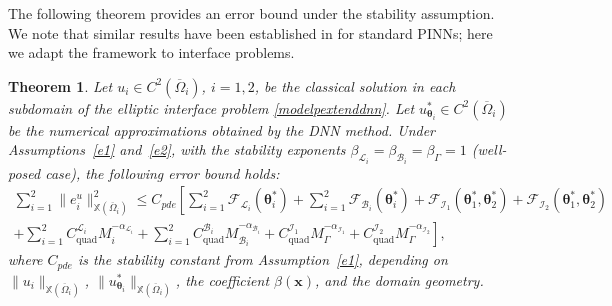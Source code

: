 \documentclass{article}
\newtheorem{theorem}{Theorem}[section]
\begin{document}
The following theorem provides an error bound under the stability assumption. We note that similar results have been established in \cite{mishra2023estimates} for standard PINNs; here we adapt the framework to interface problems.
\begin{theorem}\label{thm:errorEstimation}
Let $u_i \in C^2(\overline{\Omega}_i)$, $i = 1, 2$, be the classical solution in each subdomain of the elliptic interface problem \eqref{modelpextenddnn}. Let $u_{\boldsymbol{\theta}_i}^{*} \in C^2(\overline{\Omega}_i)$ be the numerical approximations obtained by the DNN method. Under Assumptions~\ref{e1} and~\ref{e2}, with the stability exponents $\beta_{\mathcal{L}_i} = \beta_{\mathcal{B}_i} = \beta_{\Gamma} = 1$ (well-posed case), the following error bound holds:
\begin{equation}
\begin{aligned}
\sum_{i=1}^{2} \|e_i^u\|^2_{\mathbb{X}(\overline{\Omega}_i)} \leq C_{pde} \left[ \sum_{i=1}^{2} \mathcal{F}_{\mathcal{L}_i}(\boldsymbol{\theta}_i^*) + \sum_{i=1}^{2} \mathcal{F}_{\mathcal{B}_i}(\boldsymbol{\theta}_i^*) + \mathcal{F}_{\mathcal{I}_1}(\boldsymbol{\theta}_1^*, \boldsymbol{\theta}_2^*) + \mathcal{F}_{\mathcal{I}_2}(\boldsymbol{\theta}_1^*, \boldsymbol{\theta}_2^*) \right.\\
\left. + \sum_{i=1}^{2} C_{\text{quad}}^{\mathcal{L}_i}M_{i}^{-\alpha_{\mathcal{L}_i}} + \sum_{i=1}^{2} C_{\text{quad}}^{\mathcal{B}_i}M_{\mathcal{B}_i}^{-\alpha_{\mathcal{B}_i}} + C_{\text{quad}}^{\mathcal{I}_1}M_{\Gamma}^{-\alpha_{\mathcal{I}_1}} + C_{\text{quad}}^{\mathcal{I}_2}M_{\Gamma}^{-\alpha_{\mathcal{I}_2}} \right],
\end{aligned}
\end{equation}
where $C_{pde}$ is the stability constant from Assumption~\ref{e1}, depending on $\|u_i\|_{\mathbb{X}(\overline{\Omega}_i)}$, $\|u_{\boldsymbol{\theta}_i}^{*}\|_{\mathbb{X}(\overline{\Omega}_i)}$, the coefficient $\beta(\boldsymbol{x})$, and the domain geometry.
\end{theorem}
\end{document}
